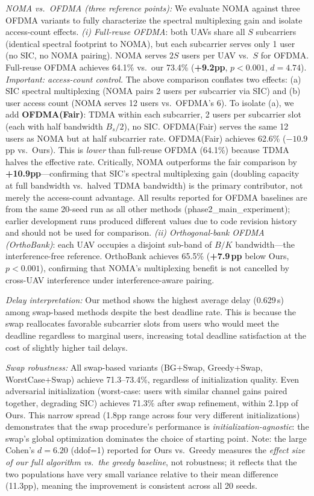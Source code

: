 \documentclass[journal]{IEEEtran}
\begin{document}
\emph{NOMA vs.\ OFDMA (three reference points):}
We evaluate NOMA against three OFDMA variants to fully characterize the spectral multiplexing gain and isolate access-count effects.
\emph{(i) Full-reuse OFDMA}: both UAVs share all $S$ subcarriers (identical spectral footprint to NOMA), but each subcarrier serves only 1 user (no SIC, no NOMA pairing). NOMA serves $2S$ users per UAV vs.\ $S$ for OFDMA. Full-reuse OFDMA achieves 64.1\% vs.\ our 73.4\% (\textbf{+9.2pp}, $p<0.001$, $d=4.74$).
\emph{Important: access-count control.} The above comparison conflates two effects: (a) SIC spectral multiplexing (NOMA pairs 2 users per subcarrier via SIC) and (b) user access count (NOMA serves 12 users vs.\ OFDMA's 6). To isolate (a), we add \textbf{OFDMA(Fair)}: TDMA within each subcarrier, 2 users per subcarrier slot (each with half bandwidth $B_s/2$), no SIC. OFDMA(Fair) serves the same 12 users as NOMA but at half subcarrier rate.
OFDMA(Fair) achieves 62.6\% ($-10.9$\,pp vs.\ Ours). This is \emph{lower} than full-reuse OFDMA (64.1\%) because TDMA halves the effective rate. Critically, NOMA outperforms the fair comparison by \textbf{+10.9pp}---confirming that SIC's spectral multiplexing gain (doubling capacity at full bandwidth vs.\ halved TDMA bandwidth) is the primary contributor, not merely the access-count advantage.
All results reported for OFDMA baselines are from the same 20-seed run as all other methods (phase2\_main\_experiment); earlier development runs produced different values due to code revision history and should not be used for comparison.
\emph{(ii) Orthogonal-bank OFDMA (OrthoBank)}: each UAV occupies a disjoint sub-band of $B/K$ bandwidth---the interference-free reference.
OrthoBank achieves 65.5\% (\textbf{+7.9\,pp} below Ours, $p<0.001$), confirming that NOMA's multiplexing benefit is not cancelled by cross-UAV interference under interference-aware pairing.

\emph{Delay interpretation:}
Our method shows the highest average delay (0.629\,s) among swap-based methods despite the best deadline rate.
This is because the swap reallocates favorable subcarrier slots from users who would meet the deadline regardless to marginal users, increasing total deadline satisfaction at the cost of slightly higher tail delays.

\emph{Swap robustness:}
All swap-based variants (BG+Swap, Greedy+Swap, WorstCase+Swap) achieve 71.3--73.4\%, regardless of initialization quality.
Even adversarial initialization (worst-case: users with similar channel gains paired together, degrading SIC) achieves 71.3\% after swap refinement, within 2.1pp of Ours.
This narrow spread (1.8pp range across four very different initializations) demonstrates that the swap procedure's performance is \emph{initialization-agnostic}: the swap's global optimization dominates the choice of starting point.
Note: the large Cohen's $d = 6.20$ (ddof=1) reported for Ours vs.\ Greedy measures the \emph{effect size of our full algorithm vs.\ the greedy baseline}, not robustness; it reflects that the two populations have very small variance relative to their mean difference (11.3pp), meaning the improvement is consistent across all 20 seeds.
\end{document}
